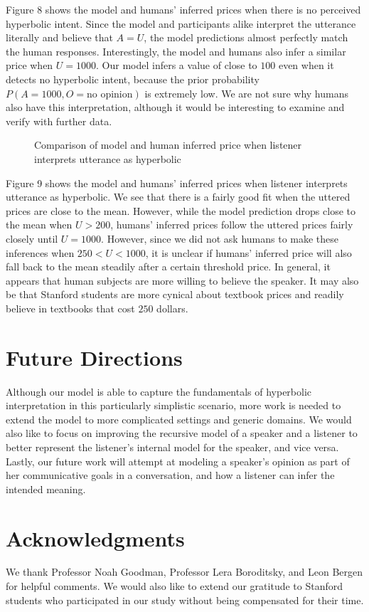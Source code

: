 \documentclass{article} %
\begin{document}
Figure 8 shows the model and humans' inferred prices when there is no perceived hyperbolic intent. Since the model and participants alike interpret the utterance literally and believe that $A = U$, the model predictions almost perfectly match the human responses. Interestingly, the model and humans also infer a similar price when $U = 1000$. Our model infers a value of close to $100$ even when it detects no hyperbolic intent, because the prior probability $P(A = 1000, O = \text{no opinion})$ is extremely low. We are not sure why humans also have this interpretation, although it would  be interesting to examine and verify with further data.

\begin{figure}[tl]
\caption{Comparison of model and human inferred price when listener interprets utterance as hyperbolic}
\end{figure}

Figure 9 shows the model and humans' inferred prices when listener interprets utterance as hyperbolic. We see that there is a fairly good fit when the uttered prices are close to the mean. However, while the model prediction drops close to the mean when $U > 200$, humans' inferred prices follow the uttered prices fairly closely until $U = 1000$. However, since we did not ask humans to make these inferences when $ 250 < U < 1000$, it is unclear if humans' inferred price will also fall back to the mean steadily after a certain threshold price. In general, it appears that human subjects are more willing to believe the speaker. It may also be that Stanford students are more cynical about textbook prices and readily believe in textbooks that cost $250$ dollars.


\section{Future Directions}
Although our model is able to capture the fundamentals of hyperbolic interpretation in this particularly simplistic scenario, more work is needed to extend the model to more complicated settings and generic domains. We would also like to focus on improving the recursive model of a speaker and a listener to better represent the listener's internal model for the speaker, and vice versa. Lastly, our future work will attempt at modeling a speaker's opinion as part of her communicative goals in a conversation, and how a listener can infer the intended meaning.

\section{Acknowledgments}

We thank Professor Noah Goodman, Professor Lera Boroditsky, and Leon Bergen for helpful comments. We would also like to extend our gratitude to Stanford students who participated in our study without being compensated for their time.





\setlength{\bibleftmargin}{.125in}
\setlength{\bibindent}{-\bibleftmargin}


\end{document}
